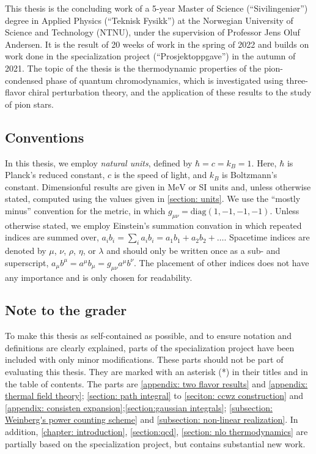 This thesis is the concluding work of a 5-year Master of Science (``Sivilingeniør'') degree in Applied Physics (``Teknisk Fysikk'') at the Norwegian University of Science and Technology (NTNU), under the supervision of Professor Jens Oluf Andersen.
It is the result of 20 weeks of work in the spring of 2022 and builds on work done in the specialization project (``Prosjektoppgave'') in the autumn of 2021.
The topic of the thesis is the thermodynamic properties of the pion-condensed phase of quantum chromodynamics, which is investigated using three-flavor chiral perturbation theory, and the application of these results to the study of pion stars.

\subsection*{Conventions}

In this thesis, we employ \emph{natural units}, defined by $\hbar = c = k_B = 1$.
Here, $\hbar$ is Planck's reduced constant, $c$ is the speed of light, and $k_B$ is Boltzmann's constant.
Dimensionful results are given in $\text{MeV}$ or SI units and, unless otherwise stated, computed using the values given in \autoref{section: units}.
We use the ``mostly minus'' convention for the metric, in which $g_{\mu \nu} = \text{diag}(1, -1, -1, -1)$.
Unless otherwise stated, we employ Einstein's summation convation in which repeated indices are summed over, $a_i b_i = {\sum}_i a_i b_i = a_1 b_1 +  a_2 b_2 +\dots$.
Spacetime indices are denoted by $\mu$, $\nu$, $\rho$, $\eta$, or $\lambda$ and should only be written once as a sub- and superscript, $a_\mu b^\mu = a^\mu b_\mu = g_{\mu\nu}a^\mu b^\nu$.
The placement of other indices does not have any importance and is only chosen for readability.


\subsection*{Note to the grader}

To make this thesis as self-contained as possible, and to ensure notation and definitions are clearly explained, parts of the specialization project have been included with only minor modifications.
These parts should not be part of evaluating this thesis.
They are marked with an asterisk (*) in their titles and in the table of contents.
The parts are \autoref{appendix: two flavor results} and \autoref{appendix: thermal field theory}; \autoref{section: path integral} to \autoref{seciton: ccwz construction} and \autoref{appendix: consisten expansion};\autoref{section:gaussian integrals}; \autoref{subsection: Weinberg's power counting scheme} and \autoref{subsection: non-linear realization}.
In addition, \autoref{chapter: introduction}, \autoref{section:qcd}, \autoref{section: nlo thermodynamics} are partially based on the specialization project, but contains substantial new work.


